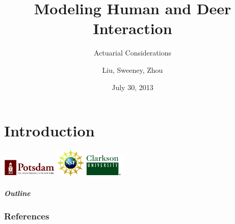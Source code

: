 \documentclass{beamer}   %
\begin{document}
\part{Introduction}


\title{Modeling Human and Deer Interaction}
\subtitle{Actuarial Considerations}

\author{Liu, Sweeney, Zhou}
\date{July 30, 2013}

\begin{frame}[plain]
  \titlepage
  \begin{center}
  \includegraphics[width=0.2\textwidth]{SUNYPotsdam}
  \includegraphics[width=0.1\textwidth]{nsf_logobig}
  \includegraphics[width=0.15\textwidth]{clarksonGreen}
\end{center}
\end{frame}

\begin{frame}
  \frametitle{Outline}
  \vspace{-5mm}
\end{frame}











\section{References}
\end{document}
